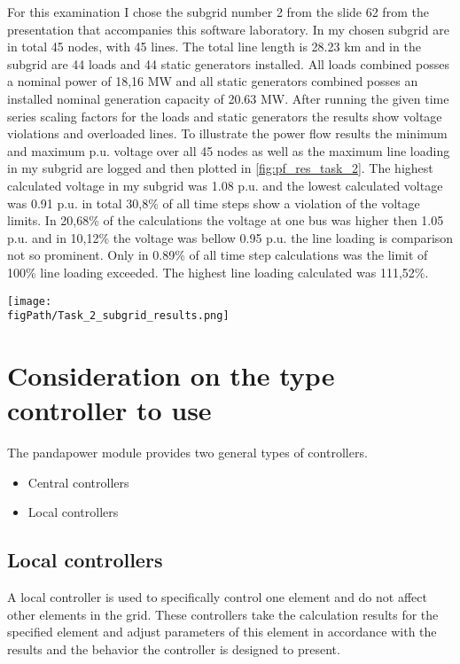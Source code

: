 \documentclass[conference]{IEEEtran}
\newcommand{\figPath}{images}
\begin{document}
For this examination I chose the subgrid number 2 from the slide 62 from the presentation that accompanies this software laboratory.\cite[S.62]{software.lab.pp.2023} In my chosen subgrid are in total 45 nodes, with 45 lines. The total line length is 28.23 km and in the subgrid are 44 loads and 44 static generators installed. All loads combined posses a nominal power of 18,16 MW and all static generators combined posses an installed nominal generation capacity of 20.63 MW. After running the given time series scaling factors for the loads and static generators the results show voltage violations and overloaded lines. To illustrate the power flow results the minimum and maximum p.u. voltage over all 45 nodes as well as the maximum line loading in my subgrid are logged and then plotted in \cref{fig:pf_res_task_2}. The highest calculated voltage in my subgrid was 1.08 p.u. and the lowest calculated voltage was 0.91 p.u. in total 30,8\% of all time steps show a violation of the voltage limits. In 20,68\% of the calculations the voltage at one bus was higher then 1.05 p.u. and in 10,12\% the voltage was bellow 0.95 p.u. the line loading is comparison not so prominent. Only in 0.89\% of all time step calculations was the limit of 100\% line loading exceeded. The highest line loading calculated was 111,52\%.

\begin{figure*}[htbp]
	\centering
	\texttt{[image: \\figPath/Task\_2\_subgrid\_results.png]}
	\caption{Power flow results from the time series calculation}
	\label{fig:pf_res_task_2}
\end{figure*}

\section{Consideration on the type controller to use}

The pandapower module provides two general types of controllers. 
\begin{itemize}
	\item Central controllers
	\item Local controllers
\end{itemize}
\subsection{Local controllers}
A local controller is used to specifically control one element and do not affect other elements in the grid. These controllers take the calculation results for the specified element and adjust parameters of this element in accordance with the results and the behavior the controller is designed to present.
\end{document}
